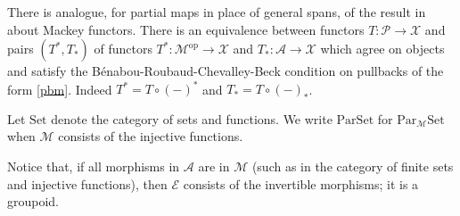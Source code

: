 \documentclass[a4paper,12pt,reqno]{amsart}
\theoremstyle{definition}
\theoremstyle{fact}
\theoremstyle{genquest}
\theoremstyle{step}
\newcommand{\lra}{\longrightarrow}
\def\CA{{\mathscr A}}
\def\CE{{\mathscr E}}
\def\CM{{\mathscr M}}
\def\CP{{\mathscr P}}
\def\CX{{\mathscr X}}
\begin{document}
There is analogue, for partial maps in place of general spans, of the result in
\cite{Lindner1976} about Mackey functors.
There is an equivalence between functors $T : \CP \lra \CX$
and pairs $(T^*,T_*)$ of functors 
$T^* : \CM^{\mathrm{op}} \lra \CX$
and $T_* : \CA \lra \CX$
which agree on objects and satisfy the B\'enabou-Roubaud-Chevalley-Beck condition on pullbacks of the form \eqref{pbm}. 
Indeed $T^*=T\circ (-)^*$ and $T_*=T\circ (-)_*$. 

Let $\mathrm{Set}$ denote the category of sets and functions. 
We write $\mathrm{Par}\mathrm{Set}$ for $\mathrm{Par}_{\CM}\mathrm{Set}$ 
when $\CM$ consists of the injective functions.

Notice that, if all morphisms in $\CA$ are in $\CM$ (such as in the
category of finite sets and injective functions), 
then $\CE$ consists of the invertible morphisms; it is a groupoid.
\end{document}

